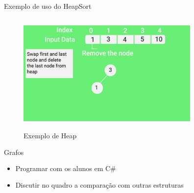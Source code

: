 \begin{frame}
	\begin{block}{Exemplo de uso do HeapSort}
		\begin{figure}[!htb]
			\centering	  				
			\includegraphics[height=6cm, width = 9cm]{./pic/scene02449.jpg}
			\caption{Exemplo de Heap \cite{GEEKS_2018}}
		\end{figure}
	\end{block}
\end{frame}




\begin{frame}
	\begin{block}{Grafos}
		\begin{itemize}
			\item Programar com os alunos em C\#
			\item Discutir no quadro a comparação com outras estruturas
		\end{itemize}
	\end{block}
\end{frame}
